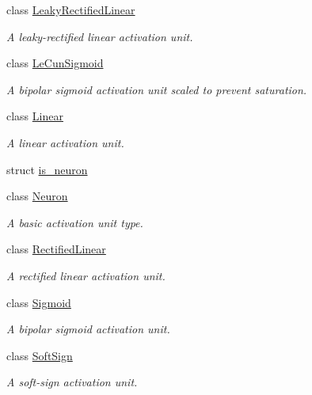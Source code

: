 \begin{DoxyCompactItemize}
\item 
class \hyperlink{classffnn_1_1neuron_1_1_leaky_rectified_linear}{Leaky\-Rectified\-Linear}
\begin{DoxyCompactList}\small\item\em A leaky-\/rectified linear activation unit. \end{DoxyCompactList}\item 
class \hyperlink{classffnn_1_1neuron_1_1_le_cun_sigmoid}{Le\-Cun\-Sigmoid}
\begin{DoxyCompactList}\small\item\em A bipolar sigmoid activation unit scaled to prevent saturation. \end{DoxyCompactList}\item 
class \hyperlink{classffnn_1_1neuron_1_1_linear}{Linear}
\begin{DoxyCompactList}\small\item\em A linear activation unit. \end{DoxyCompactList}\item 
struct \hyperlink{structffnn_1_1neuron_1_1is__neuron}{is\-\_\-neuron}
\item 
class \hyperlink{classffnn_1_1neuron_1_1_neuron}{Neuron}
\begin{DoxyCompactList}\small\item\em A basic activation unit type. \end{DoxyCompactList}\item 
class \hyperlink{classffnn_1_1neuron_1_1_rectified_linear}{Rectified\-Linear}
\begin{DoxyCompactList}\small\item\em A rectified linear activation unit. \end{DoxyCompactList}\item 
class \hyperlink{classffnn_1_1neuron_1_1_sigmoid}{Sigmoid}
\begin{DoxyCompactList}\small\item\em A bipolar sigmoid activation unit. \end{DoxyCompactList}\item 
class \hyperlink{classffnn_1_1neuron_1_1_soft_sign}{Soft\-Sign}
\begin{DoxyCompactList}\small\item\em A soft-\/sign activation unit. \end{DoxyCompactList}\end{DoxyCompactItemize}
